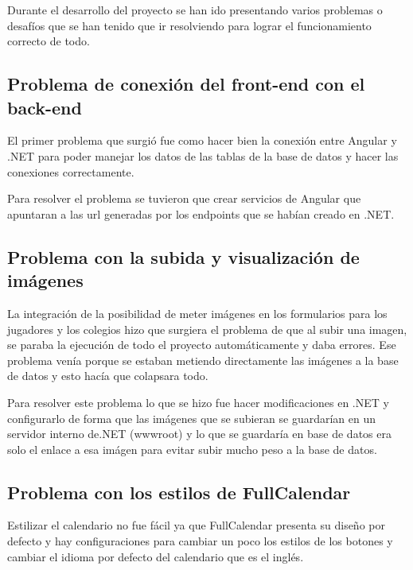 Durante el desarrollo del proyecto se han ido presentando varios problemas o desafíos que se han tenido que ir resolviendo para lograr el funcionamiento correcto de todo.

\subsection{Problema de conexión del front-end con el back-end}

El primer problema que surgió fue como hacer bien la conexión entre Angular y .NET para poder manejar los datos de las tablas de la base de datos y hacer las conexiones correctamente. 

Para resolver el problema se tuvieron que crear servicios de Angular que apuntaran a las url generadas por los endpoints que se habían creado en .NET.


\subsection{Problema con la subida y visualización de imágenes}

La integración de la posibilidad de meter imágenes en los formularios para los jugadores y los colegios hizo que surgiera el problema de que al subir una imagen, se paraba la ejecución de todo el proyecto automáticamente y daba errores. Ese problema venía porque se estaban metiendo directamente las imágenes a la base de datos y esto hacía que colapsara todo.

Para resolver este problema lo que se hizo fue hacer modificaciones en .NET y configurarlo de forma que las imágenes que se subieran se guardarían en un servidor interno de.NET (wwwroot) y lo que se guardaría en base de datos era solo el enlace a esa imágen para evitar subir mucho peso a la base de datos.



\subsection{Problema con los estilos de FullCalendar}

Estilizar el calendario no fue fácil ya que FullCalendar presenta su diseño por defecto y hay configuraciones para cambiar un poco los estilos de los botones y cambiar el idioma por defecto del calendario que es el inglés.

